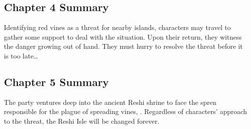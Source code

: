 \subsection{Chapter 4 Summary}

Identifying red vines as a threat for nearby islands, characters may travel to gather some support to deal with the situation. Upon their return, they witness the danger growing out of hand. They must hurry to resolve the threat before it is too late…

\subsection{Chapter 5 Summary}

The party ventures deep into the ancient Reshi shrine to face the spren responsible for the plague of spreading vines, \npcSprenVines{}. Regardless of characters’ approach to the threat, the Reshi Isle will be changed forever.

